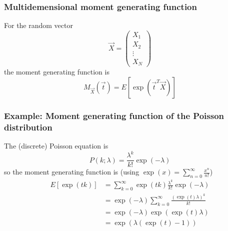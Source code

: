 \subsubsection{Multidemensional moment generating function}
For the random vector
\begin{equation}
    \vec{X} = \left( \begin{array}{c}
        X_1 \\ X_2 \\ \vdots \\ X_N
    \end{array} \right)
\end{equation}
the moment generating function is
\begin{equation}
    M_{\vec{X}}(\vec{t}) = E[\exp(\vec{t}^T \vec{X})]
\end{equation}

\subsubsection{Example: Moment generating function of the Poisson distribution}
The (discrete) Poisson equation is
\begin{equation}
    P(k;\lambda) = \frac{\lambda^k}{k!} \exp{(-\lambda)}
\end{equation}
so the moment generating function is (using $\exp(x) = \sum_{n=0}^{\infty} \frac{x^n}{n!}$)
\begin{equation}
    \begin{aligned}
        E[\exp(tk)] &= \sum_{k=0}^{\infty} \exp(tk) \frac{\lambda^k}{k!} \exp{(-\lambda)} \\
         &= \exp{(-\lambda)} \sum_{k=0}^{\infty} \frac{\left(\exp(t)\lambda\right)^k}{k!} \\
         &= \exp{(-\lambda)} \exp{\left(\exp(t)\lambda\right)} \\
         &= \exp{\left(\lambda(\exp(t)-1)\right)}
    \end{aligned}
\end{equation}

